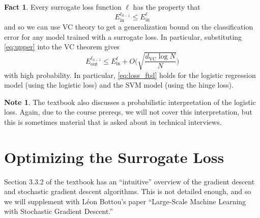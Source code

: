 \documentclass[10pt]{exam}
\theoremstyle{definition}
\newtheorem{note}{Note}
\newtheorem{example}{Example}
\newtheorem{defn}{Definition}
\newtheorem{fact}{Fact}
\newcommand{\R}{\mathbb R}
\DeclareMathOperator{\sign}{sign}
\newcommand{\Ein}{E_{\text{in}}}
\newcommand{\Eout}{E_{\text{out}}}
\newcommand{\trans}[1]{{#1}^{T}}
\newcommand{\w}{\mathbf w}
\newcommand{\x}{\mathbf x}
\newcommand{\dvc}{{d_{\text{VC}}}}
\newcommand{\HH}[1]{\mathcal H_{\text{#1}}}
\begin{document}
\begin{fact}
    Every surrogate loss function $\ell$ has the property that
    \begin{equation}
        \label{eq:upper}
        \Ein^{\ell_{0-1}} \le \Ein^{\ell}
    \end{equation}
    and so we can use VC theory to get a generalization bound on the classification error for any model trained with a surrogate loss.
    In particular, substituting \eqref{eq:upper} into the VC theorem gives
    \begin{equation}
        \label{eq:loss_ftsl}
        \Eout^{\ell_{0-1}} \le \Ein^{\ell} + O\bigg(\sqrt{\frac{\dvc\log N}{N}}\bigg)
    \end{equation}
    with high probability.
    In particular, \eqref{eq:loss_ftsl} holds for the logistic regression model (using the logistic loss) and the SVM model (using the hinge loss).
\end{fact}

\begin{note}
    The textbook also discusses a probabilistic interpretation of the logistic loss.
    Again, due to the course prereqs, we will not cover this interpretation,
    but this is sometimes material that is asked about in technical interviews.
\end{note}

\section*{Optimizing the Surrogate Loss}

Section 3.3.2 of the textbook has an ``intuitive'' overview of the gradient descent and stochastic gradient descent algorithms.
This is not detailed enough, and so we will supplement with L\'eon Bottou's paper ``Large-Scale Machine Learning with Stochastic Gradient Descent.''


%
%
\end{document}
